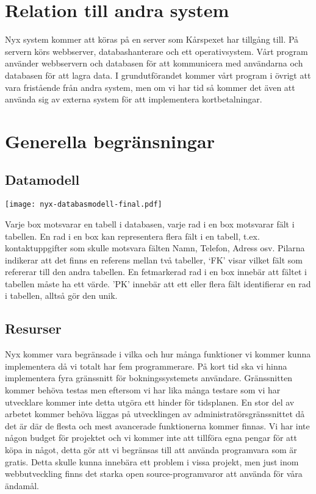 \documentclass[a4paper, twoside, 11pt, titlepage]{article}
\begin{document}
\clearpage
\section{Relation till andra system}


Nyx system kommer att köras på en server som Kårspexet har tillgång till. På servern körs webbserver, databashanterare och ett operativsystem. Vårt program använder webbservern och databasen för att kommunicera med användarna och databasen för att lagra data. I grundutförandet kommer vårt program i övrigt att vara fristående från andra system, men om vi har tid så kommer det även att använda sig av externa system för att implementera kortbetalningar.

\clearpage
\section{Generella begränsningar}



	\subsection{Datamodell}


	\texttt{[image: nyx-databasmodell-final.pdf]}

	Varje box motsvarar en tabell i databasen, varje rad i en box motsvarar fält i tabellen. En rad i en box kan representera flera fält i en tabell, t.ex. kontaktuppgifter som skulle motsvara fälten Namn, Telefon, Adress osv. Pilarna indikerar att det finns en referens mellan två tabeller, ‘FK’ visar vilket fält som refererar till den andra tabellen. En fetmarkerad rad i en box innebär att fältet i tabellen måste ha ett värde. ’PK’ innebär att ett eller flera fält identifierar en rad i tabellen, alltså gör den unik.

	\subsection{Resurser}


	Nyx kommer vara begränsade i vilka och hur många funktioner vi kommer kunna implementera då vi totalt har fem programmerare. På kort tid ska vi hinna implementera fyra gränssnitt för bokningssystemets användare. Gränssnitten kommer behöva testas men eftersom vi har lika många testare som vi har utvecklare kommer inte detta utgöra ett hinder för tidsplanen. En stor del av arbetet kommer behöva läggas på utvecklingen av administratörsgränssnittet då det är där de flesta och mest avancerade funktionerna kommer finnas. Vi har inte någon budget för projektet och vi kommer inte att tillföra egna pengar för att köpa in något, detta gör att vi begränsas till att använda programvara som är gratis. Detta skulle kunna innebära ett problem i vissa projekt, men just inom webbutveckling finns det starka open source-programvaror att använda för våra ändamål.
\end{document}
